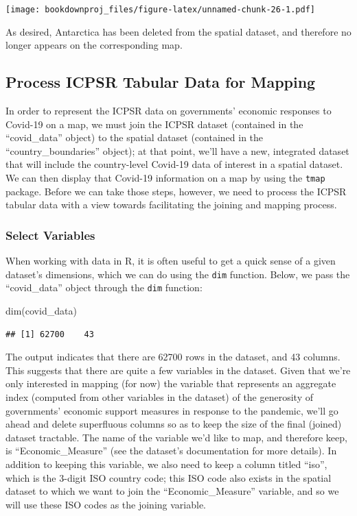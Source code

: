 \documentclass[
]{article}
\newenvironment{Shaded}{\begin{snugshade}}{\end{snugshade}}
\newcommand{\FunctionTok}[1]{\textcolor[rgb]{0.00,0.00,0.00}{#1}}
\newcommand{\NormalTok}[1]{#1}
\begin{document}
\texttt{[image: bookdownproj\_files/figure-latex/unnamed-chunk-26-1.pdf]}

As desired, Antarctica has been deleted from the spatial dataset, and therefore no longer appears on the corresponding map.

\hypertarget{process-icpsr-tabular-data-for-mapping}{%
\subsection{Process ICPSR Tabular Data for Mapping}\label{process-icpsr-tabular-data-for-mapping}}

In order to represent the ICPSR data on governments' economic responses to Covid-19 on a map, we must join the ICPSR dataset (contained in the ``covid\_data'' object) to the spatial dataset (contained in the ``country\_boundaries'' object); at that point, we'll have a new, integrated dataset that will include the country-level Covid-19 data of interest in a spatial dataset. We can then display that Covid-19 information on a map by using the \texttt{tmap} package.
Before we can take those steps, however, we need to process the ICPSR tabular data with a view towards facilitating the joining and mapping process.

\hypertarget{select-variables}{%
\subsubsection{Select Variables}\label{select-variables}}

When working with data in R, it is often useful to get a quick sense of a given dataset's dimensions, which we can do using the \texttt{dim} function. Below, we pass the ``covid\_data'' object through the \texttt{dim} function:

\begin{Shaded}
\begin{Highlighting}[]
\FunctionTok{dim}\NormalTok{(covid\_data)}
\end{Highlighting}
\end{Shaded}

\begin{verbatim}
## [1] 62700    43
\end{verbatim}

The output indicates that there are 62700 rows in the dataset, and 43 columns. This suggests that there are quite a few variables in the dataset. Given that we're only interested in mapping (for now) the variable that represents an aggregate index (computed from other variables in the dataset) of the generosity of governments' economic support measures in response to the pandemic, we'll go ahead and delete superfluous columns so as to keep the size of the final (joined) dataset tractable. The name of the variable we'd like to map, and therefore keep, is ``Economic\_Measure'' (see the dataset's documentation for more details). In addition to keeping this variable, we also need to keep a column titled ``iso'', which is the 3-digit ISO country code; this ISO code also exists in the spatial dataset to which we want to join the ``Economic\_Measure'' variable, and so we will use these ISO codes as the joining variable.
\end{document}
